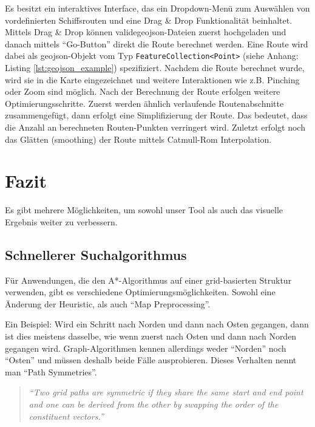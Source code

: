 \documentclass[letterpaper]{article}
\begin{document}
	Es besitzt ein interaktives Interface, das ein Dropdown-Menü zum Auswählen von vordefinierten Schiffsrouten und eine Drag \& Drop Funktionalität beinhaltet. 
	Mittels Drag \& Drop können valide\footnotemark geojson-Dateien zuerst hochgeladen und danach mittels "`Go-Button"' direkt die Route berechnet werden. Eine Route wird dabei als geojson-Objekt vom Typ \texttt{FeatureCollection<Point>} (siehe Anhang: Listing \ref{lst:geojson_example}) spezifiziert.
	Nachdem die Route berechnet wurde, wird sie in die Karte eingezeichnet und weitere Interaktionen wie z.B. Pinching oder Zoom sind möglich. Nach der Berechnung der Route erfolgen weitere Optimierungsschritte. Zuerst werden ähnlich verlaufende Routenabschnitte zusammengefügt, dann erfolgt eine Simplifizierung der Route. Das bedeutet, dass die Anzahl an berechneten Routen-Punkten verringert wird. Zuletzt erfolgt noch das Glätten (smoothing) der Route mittels Catmull-Rom Interpolation.


\section{Fazit}
	Es gibt mehrere Möglichkeiten, um sowohl unser Tool als auch das visuelle Ergebnis weiter zu verbessern.

	\subsection{Schnellerer Suchalgorithmus}
		Für Anwendungen, die den A*-Algorithmus auf einer grid-basierten Struktur verwenden, gibt es verschiedene Optimierungsmöglichkeiten. Sowohl eine Änderung der Heuristic, als auch "`Map Preprocessing"'.

		Ein Beispiel: Wird ein Schritt nach Norden und dann nach Osten gegangen, dann ist dies meistens dasselbe, wie wenn  zuerst nach Osten und dann nach Norden gegangen wird. Graph-Algorithmen kennen allerdings weder "`Norden"' noch "`Osten"' und müssen deshalb beide Fälle ausprobieren.\cite[vgl.]{patel16} Dieses Verhalten nennt man "`Path Symmetries"'.

		\begin{quote}
			\textit{"`Two grid paths are symmetric if they share the same start and end point and one can be derived from the other by swapping the order of the constituent vectors."'}\cite[p. 1]{harabor12}
		\end{quote}
\end{document}
